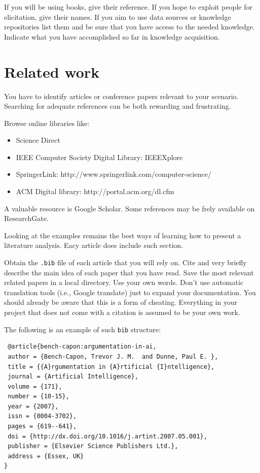 \documentclass[a4paper,12pt]{report}
\begin{document}
If you will be using books, give their reference. 
If you hope to exploit people for elicitation, give their names.
If you aim to use data sources or knowledge repositories list them and be sure that you have 
access to the needed knowledge. 
Indicate what you have accomplished so far in knowledge acquisition. 




\section{Related work}
You have to identify articles or conference papers relevant to your scenario.
Searching for adequate references can be both rewarding and frustrating.

Browse online libraries like:
\begin{itemize}
 \item Science Direct
 \item IEEE Computer Society Digital Library: IEEEXplore
 \item SpringerLink:  http://www.springerlink.com/computer-science/
 \item ACM Digital library: http://portal.acm.org/dl.cfm
\end{itemize}
A valuable resource is Google Scholar. 
Some references may be frely available on ResearchGate. 

Looking at the examples remains the best ways of learning how to present a literature analysis. 
Eacy article does include such section.


Obtain the \texttt{.bib} file of each article that you will rely on. 
Cite and very briefly describe the main idea of each paper that you have read.
Save the most relevant related papers in a local directory.
Use your own words. 
Don't use automatic translation tools (i.e., Google translate) just to expand your documentation.
You should already be aware that this is a form of cheating. 
Everything in your project that does not come with a citation is assumed to be your own work.


The following is an example of such \texttt{bib} structure:

\begin{verbatim}
 @article{bench-capon:argumentation-in-ai,
 author = {Bench-Capon, Trevor J. M.  and Dunne, Paul E. },
 title = {{A}rgumentation in {A}rtificial {I}ntelligence},
 journal = {Artificial Intelligence},
 volume = {171},
 number = {10-15},
 year = {2007},
 issn = {0004-3702},
 pages = {619--641},
 doi = {http://dx.doi.org/10.1016/j.artint.2007.05.001},
 publisher = {Elsevier Science Publishers Ltd.},
 address = {Essex, UK}
}
\end{verbatim}
\end{document}
